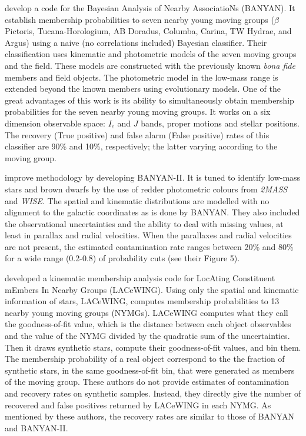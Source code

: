 \citet{Malo2013} develop a code for the Bayesian Analysis of Nearby AssociatioNs (BANYAN). It establish membership probabilities to seven nearby young moving groups ($\beta$ Pictoris, Tucana-Horologium, AB Doradus, Columba, Carina, TW Hydrae, and Argus) using a naive (no correlations included) Bayesian classifier. Their classification uses kinematic and photometric models of the seven moving groups and the field. These models are constructed with the previously known \emph{bona fide} members and field objects. The photometric model in the low-mass range is extended beyond the known members using evolutionary models. One of the great advantages of this work is its ability to simultaneously obtain membership probabilities for the seven nearby young moving groups. It works on a six dimension observable space: $I_c$ and $J$ bands, proper motions and stellar positions. The recovery (True positive) and false alarm (False positive) rates of this classifier are 90\% and 10\%, respectively; the latter varying according to the moving group.

\citet{Gagne2014} improve \citet{Malo2013} methodology by developing BANYAN-II. It is tuned to  identify low-mass stars and brown dwarfs by the use of redder photometric colours from \emph{2MASS} and \emph{WISE}. The spatial and kinematic distributions are modelled with no alignment to the galactic coordinates as is done by BANYAN. They also included the observational uncertainties and the ability to deal with missing values, at least in parallax and radial velocities. When the parallaxes and radial velocities are not present, the estimated contamination rate ranges between 20\% and 80\% for a wide range (0.2-0.8) of probability cuts (see their Figure 5).

\citet{Riedel2017} developed a kinematic membership analysis code for LocAting Constituent mEmbers In Nearby Groups (LACeWING). Using only the spatial and kinematic information of stars, LACeWING, computes membership probabilities to 13 nearby young moving groups (NYMGs). LACeWING computes what they call the goodness-of-fit value, which is the distance between each object observables and the value of the NYMG divided by the quadratic sum of the uncertainties. Then it draws synthetic stars, compute their goodness-of-fit values, and bin them. The membership probability of a real object correspond to the the fraction of synthetic stars, in the same goodness-of-fit bin, that were generated as members of the moving group. These authors do not provide estimates of contamination and recovery rates on synthetic samples. Instead, they directly give the number of recovered and false positives returned by LACeWING in each NYMG. As mentioned by these authors, the recovery rates are similar to those of BANYAN and BANYAN-II. 


